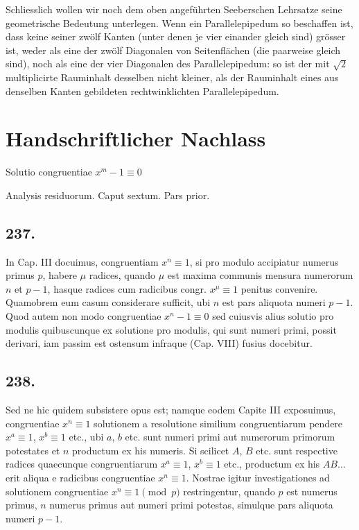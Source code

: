 \documentclass[12pt]{article}
\begin{document}
Schliesslich wollen wir noch dem oben angeführten Seeberschen Lehrsatze seine geometrische Bedeutung unterlegen. Wenn ein Parallelepipedum so beschaffen ist, dass keine seiner zwölf Kanten (unter denen je vier einander gleich sind) grösser ist, weder als eine der zwölf Diagonalen von Seitenflächen (die paarweise gleich sind), noch als eine der vier Diagonalen des Parallelepipedum: so ist der mit $\sqrt2$ multiplicirte Rauminhalt desselben nicht kleiner, als der Rauminhalt eines aus denselben Kanten gebildeten rechtwinklichten Parallelepipedum.



\clearpage

\section*{Handschriftlicher Nachlass}

\begin{center}
{\large Solutio congruentiae $x^m-1 \equiv 0$}\par
{\large Analysis residuorum. Caput sextum. Pars prior.}
\end{center}

\subsection*{237.}
In Cap. III docuimus, congruentiam $x^n\equiv 1$, si pro modulo accipiatur numerus primus $p$, habere $\mu$ radices, quando $\mu$ est maxima communis mensura numerorum $n$ et $p-1$, hasque radices cum radicibus congr. $x^\mu\equiv 1$ penitus convenire. Quamobrem eum casum considerare sufficit, ubi $n$ est pars aliquota numeri $p-1$. Quod autem non modo congruentiae $x^n-1\equiv 0$ sed cuiusvis alius solutio pro modulis quibuscunque ex solutione pro modulis, qui sunt numeri primi, possit derivari, iam passim est ostensum infraque (Cap. VIII) fusius docebitur.

\subsection*{238.}
Sed ne hic quidem subsistere opus est; namque eodem Capite III exposuimus, congruentiae $x^n\equiv 1$ solutionem a resolutione similium congruentiarum pendere $x^a\equiv 1$, $x^b\equiv 1$ etc., ubi $a$, $b$ etc. sunt numeri primi aut numerorum primorum potestates et $n$ productum ex his numeris. Si scilicet $A$, $B$ etc. sunt respective radices quaecunque congruentiarum $x^a\equiv 1$, $x^b\equiv 1$ etc., productum ex his $AB\ldots$ erit aliqua e radicibus congruentiae $x^n\equiv 1$. Nostrae igitur investigationes ad solutionem congruentiae $x^n\equiv 1\pmod p$ restringentur, quando $p$ est numerus primus, $n$ numerus primus aut numeri primi potestas, simulque pars aliquota numeri $p-1$.
\end{document}
